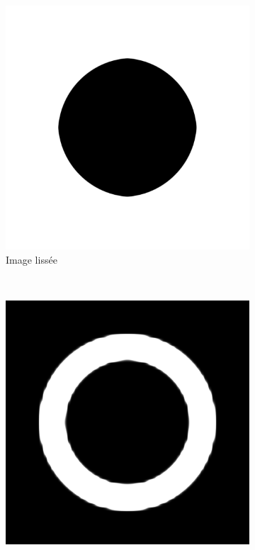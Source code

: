 \begin{figure}
\begin{subfigure}{.22\textwidth}
        \includegraphics[width=\textwidth]{contenu/resources/images/disk_blur}
        \caption{Image lissée}
    \end{subfigure}
    \\
    \begin{subfigure}{.22\textwidth}
        \centering
        \includegraphics[width=\textwidth]{contenu/resources/images/pc_blur_nospread}

\end{subfigure}
\end{figure}
